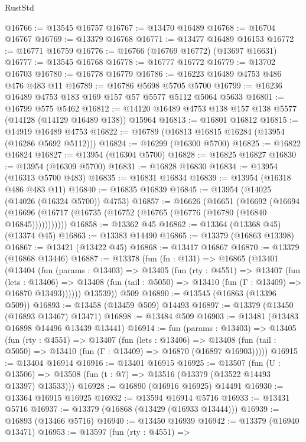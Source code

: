 \begin{lexlean}{RustStd}
\begin{coremodule}
@16766 := @13545 @16757
@16767 := @13470 @16489
@16768 := @16704 @16767
@16769 := @13379 @16768
@16771 := @13477 @16489 @16153
@16772 := @16771 @16759
@16776 := @16766 (@16769 @16772) (@13697 @16631)
@16777 := @13545 @16768
@16778 := @16777 @16772
@16779 := @13702 @16703
@16780 := @16778 @16779
@16786 := @16223 @16489 @4753 @486 @476 @483 @11
@16789 := @16786 @5698 @5705 @5700
@16799 := @16236 @16489 @4753 @183 @169 @157 @57 @5577 @5112 @5064 @5633
@16801 := @16799 @575 @5462
@16812 := @14120 @16489 @4753 @138 @157 @138 @5577 (@14128 (@14129 @16489 @138)) @15964
@16813 := @16801 @16812
@16815 := @14919 @16489 @4753
@16822 := @16789 (@16813 @16815 @16284 (@13954 (@16286 @5692 @5112)))
@16824 := @16299 (@16300 @5700)
@16825 := @16822 @16824
@16827 := @13954 (@16304 @5700)
@16828 := @16825 @16827
@16830 := @13954 (@16309 @5700)
@16831 := @16828 @16830
@16834 := @13954 (@16313 @5700 @483)
@16835 := @16831 @16834
@16839 := @13954 (@16318 @486 @483 @11)
@16840 := @16835 @16839
@16845 := @13954 (@14025 (@14026 (@16324 @5700)) @4753)
@16857 := @16626
    (@16651
      (@16692
        (@16694 (@16696 (@16717 (@16735 (@16752 (@16765 (@16776 (@16780 (@16840 @16845)))))))))))
@16858 := @13362 @45
@16862 := @13364 (@13368 @45) (@13374 @45)
@16863 := @13383 @14490
@16865 := @13379 (@16863 @13398)
@16867 := @13421 (@13422 @45)
@16868 := @13417 @16867
@16870 := @13379 (@16868 @13446)
@16887 := @13378
    (fun (fn : @131) =>
    @16865
      (@13401
        (@13404
          (fun (params : @13403) =>
          @13405
            (fun (rty : @4551) =>
            @13407
              (fun (lets : @13406) =>
              @13408 (fun (tail : @5050) => @13410 (fun (Γ : @13409) => @16870 @13493))))))
        @13539))
    @509
@16890 := @13545 (@16863 (@13396 @509))
@16893 := @13458 (@13459 @509) @14493
@16897 := @13379 (@13450 (@16893 @13467) @13471)
@16898 := @13484 @509
@16903 := @13481 (@13483 @16898 @14496 @13439 @13441)
@16914 := fun (params : @13403) =>
  @13405
    (fun (rty : @4551) =>
    @13407
      (fun (lets : @13406) =>
      @13408 (fun (tail : @5050) => @13410 (fun (Γ : @13409) => @16870 (@16897 @16903)))))
@16915 := @13404 @16914
@16916 := @13401 @16915
@16925 := @13507
    (fun (U : @13506) => @13508 (fun (t : @7) => @13516 (@13379 (@13522 @14493 @13397) @13533)))
@16928 := @16890 (@16916 @16925) @14491
@16930 := @13364 @16915 @16925
@16932 := @13594 @16914 @5716
@16933 := @13431 @5716
@16937 := @13379 (@16868 (@13429 (@16933 @13444)))
@16939 := @16893 (@13466 @5716)
@16940 := @13450 @16939
@16942 := @13379 (@16940 @13471)
@16953 := @13597
    (fun (rty : @4551) =>

\end{coremodule}
\end{lexlean}
